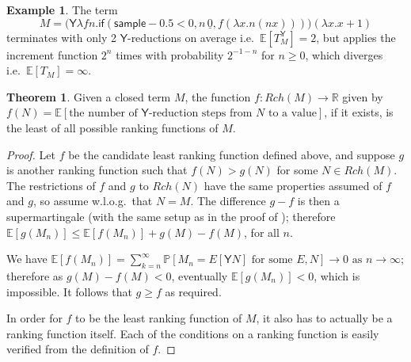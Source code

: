 \documentclass{article}
\newcommand\expect[1]{\mathbb{E}[#1]}
\newcommand{\tY}{\mathsf{Y}}
\newcommand{\tif}[3]{\mathsf{if}(#1, #2, #3)} %
\newcommand{\tsample}{\mathsf{sample}}
\theoremstyle{definition}
\newtheorem{example}{Example}
\theoremstyle{lemma}
\newtheorem{theorem}{Theorem}
\theoremstyle{remark}
\begin{document}
\begin{example}
\label{ex:tY finite does not imply t finite}
The term
\[
M = \big(\tY \lambda f n. \tif{\tsample - 0.5 < 0}{n \, \underline 0}{f (\lambda x. n (n x))}\big) (\lambda x. x+1)
\] 
terminates with only 2 $\tY$-reductions on average i.e.~$\expect{T_M^\tY} = 2$, but applies the increment function $2^n$ times with probability $2^{-1-n}$ for $n \geq 0$, which diverges i.e.~$\expect{T_M} = \infty$.
\end{example}

\begin{theorem} \label{thm:minimal}
Given a closed term $M$, the function $f:Rch(M) \to \mathbb R$ given by $f(N) = \mathbb E [\text{the number of }\tY\text{-reduction steps from }N\text{ to a value}]$, if it exists, is the least of all possible ranking functions of $M$.
\end{theorem}
\begin{proof}
Let $f$ be the candidate least ranking function defined above, and suppose $g$ is another ranking function such that $f(N) > g(N)$ for some $N \in Rch(M)$. The restrictions of $f$ and $g$ to $Rch(N)$ have the same properties assumed of $f$ and $g$, so assume w.l.o.g.~that $N=M$. The difference $g - f$ is then a supermartingale (with the same setup as in the proof of %
);
therefore $\mathbb E[g(M_n)] \leq \mathbb E[f(M_n)] + g(M)-f(M)$, for all $n$.

We have $\mathbb E[f(M_n)] = \sum_{k=n}^\infty \mathbb P[M_n = E[\tY N] \text{ for some }E, N] \to 0 \text{ as } n \to \infty$; 
therefore as $g(M) - f(M) < 0$, eventually $\mathbb E[g(M_n)] < 0$, which is impossible. 
It follows that $g \geq f$ as required.

In order for $f$ to be the least ranking function of $M$, it also has to actually be a ranking function itself. Each of the conditions on a ranking function is easily verified from the definition of $f$.
\end{proof}
\end{document}
